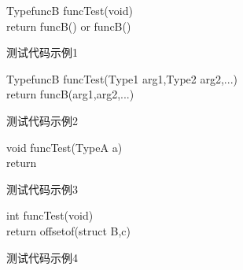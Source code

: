 \begin{minipage}{0.45\textwidth}
  \begin{algorithm}[H]
    \SetAlgoLined
    TypefuncB funcTest(void){\\
      return funcB()\;
        or \;
      funcB()\;
    }
    \caption{测试代码示例1}
    \label{algo:algorithm2}
  \end{algorithm}
\end{minipage}
\hfill
\begin{minipage}{0.45\textwidth}
  \begin{algorithm}[H]
    \SetAlgoLined
    TypefuncB funcTest(Type1 arg1,Type2 arg2,...){\\
      return funcB(arg1,arg2,...)\;
    }
    \caption{测试代码示例2}
    \label{algo:algorithm3}
  \end{algorithm}
\end{minipage}

\begin{minipage}{0.45\textwidth}
  \begin{algorithm}[H]
    \SetAlgoLined
    void funcTest(TypeA a){\\
      return \;
    }
    \caption{测试代码示例3}
    \label{algo:algorithm4}
  \end{algorithm}
\end{minipage}
\hfill
\begin{minipage}{0.45\textwidth}
  \begin{algorithm}[H]
    \SetAlgoLined
    int funcTest(void){\\
      return offsetof(struct B,c) \;
    }
    \caption{测试代码示例4}
    \label{algo:algorithm5}
  \end{algorithm}
\end{minipage}




